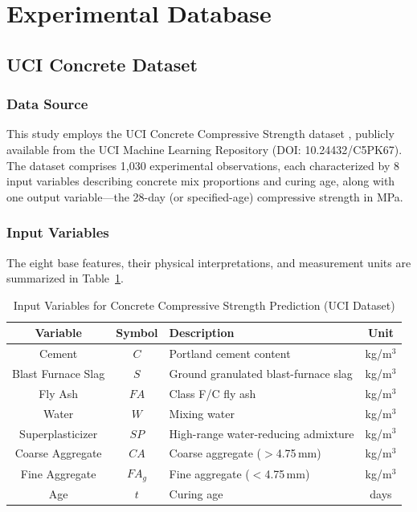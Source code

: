 \documentclass[journal]{IEEEtran}
\begin{document}
\section{Experimental Database}

\subsection{UCI Concrete Dataset}

\subsubsection{Data Source}

This study employs the UCI Concrete Compressive Strength dataset \cite{yeh1998concrete}, publicly available from the UCI Machine Learning Repository (DOI: 10.24432/C5PK67). The dataset comprises 1{,}030 experimental observations, each characterized by 8 input variables describing concrete mix proportions and curing age, along with one output variable---the 28-day (or specified-age) compressive strength in MPa.

\subsubsection{Input Variables}

The eight base features, their physical interpretations, and measurement units are summarized in Table~\ref{tab:variables}.

\begin{table}[!t]
\renewcommand{\arraystretch}{1.2}
\caption{Input Variables for Concrete Compressive Strength Prediction (UCI Dataset)}
\label{tab:variables}
\centering
\begin{tabular}{ccp{4.2cm}c}
\toprule
\textbf{Variable} & \textbf{Symbol} & \textbf{Description} & \textbf{Unit} \\
\midrule
Cement            & $C$    & Portland cement content              & kg/m$^3$ \\
Blast Furnace Slag& $S$    & Ground granulated blast-furnace slag & kg/m$^3$ \\
Fly Ash           & $FA$   & Class F/C fly ash                    & kg/m$^3$ \\
Water             & $W$    & Mixing water                         & kg/m$^3$ \\
Superplasticizer  & $SP$   & High-range water-reducing admixture  & kg/m$^3$ \\
Coarse Aggregate  & $CA$   & Coarse aggregate ($>$4.75\,mm)       & kg/m$^3$ \\
Fine Aggregate    & $FA_g$ & Fine aggregate ($<$4.75\,mm)         & kg/m$^3$ \\
Age               & $t$    & Curing age                           & days \\
\bottomrule
\end{tabular}
\end{table}
\end{document}
